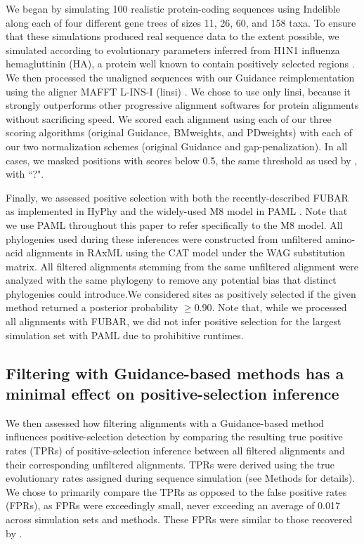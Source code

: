 \documentclass[10pt]{article}
\begin{document}
We began by simulating 100 realistic protein-coding sequences using Indelible \citep{Fletcher2009} along each of four different gene trees of sizes 11, 26, 60, and 158 taxa. To ensure that these simulations produced real sequence data to the extent possible, we simulated according to evolutionary parameters inferred from H1N1 influenza hemagluttinin (HA), a protein well known to contain positively selected regions \citep{Bush1999, Kryazhimskiy2008, Meyer2012}. We then processed the unaligned sequences with our Guidance reimplementation using the aligner MAFFT L-INS-I (linsi) \citep{Katoh2005}. We chose to use only linsi, because it strongly outperforms other progressive alignment softwares for protein alignments \citep{Thompson2011,Nuin2006} without sacrificing speed. We scored each alignment using each of our three scoring algorithms (original Guidance, BMweights, and PDweights) with each of our two normalization schemes (original Guidance and gap-penalization). In all cases, we masked positions with scores below 0.5, the same threshold as used by \citet{Jordan2012}, with ``?".

Finally, we assessed positive selection with both the recently-described FUBAR \citep{Murrell2013} as implemented in HyPhy \citep{Pond2005} and the widely-used M8 model in PAML \citep{Yang2007}. Note that we use PAML throughout this paper to refer specifically to the M8 model.  All phylogenies used during these inferences were constructed from unfiltered amino-acid alignments in RAxML \citep{Stamatakis2006} using the CAT model under the WAG substitution matrix. All filtered alignments stemming from the same unfiltered alignment were analyzed with the same phylogeny to remove any potential bias that distinct phylogenies could introduce.We considered sites as positively selected if the given method returned a posterior probability $\geq0.90$. Note that, while we processed all alignments with FUBAR, we did not infer positive selection for the largest simulation set with PAML due to prohibitive runtimes. 


\subsection*{Filtering with Guidance-based methods has a minimal effect on positive-selection inference}

We then assessed how filtering alignments with a Guidance-based method influences positive-selection detection by comparing the resulting true positive rates (TPRs) of positive-selection inference between all filtered alignments and their corresponding unfiltered alignments. TPRs were derived using the true evolutionary rates assigned during sequence simulation (see Methods for details). We chose to primarily compare the TPRs as opposed to the false positive rates (FPRs), as FPRs were exceedingly small, never exceeding an average of 0.017 across simulation sets and methods. These FPRs were similar to those recovered by \citet{Jordan2012}. 
\end{document}
